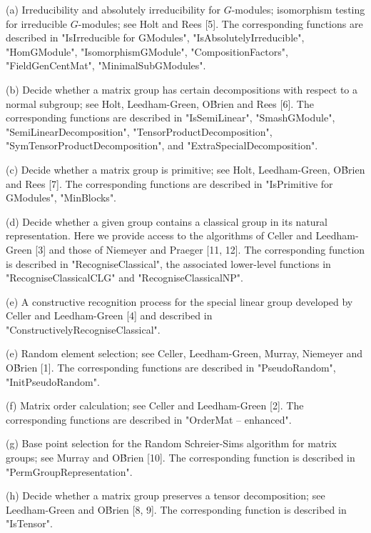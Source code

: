 (a) Irreducibility  and   absolutely irreducibility   for $G$-modules;
    isomorphism testing for irreducible $G$-modules; see Holt and Rees
    [5].  The  corresponding functions are described in "IsIrreducible
    for     GModules",      "IsAbsolutelyIrreducible",   "HomGModule",
    "IsomorphismGModule",   "CompositionFactors",   "FieldGenCentMat",
    "MinimalSubGModules".

(b) Decide whether a matrix group  has certain decompositions with
    respect  to a normal subgroup;  see Holt, Leedham-Green, O\'Brien and
    Rees  [6].    The   corresponding   functions  are    described    in
    "IsSemiLinear",       "SmashGModule",      "SemiLinearDecomposition",
    "TensorProductDecomposition",   "SymTensorProductDecomposition",  and
    "ExtraSpecialDecomposition".

(c) Decide whether a matrix group  is primitive; see Holt, Leedham-Green,
    O\'Brien and Rees [7].  The  corresponding functions are described in
    "IsPrimitive for GModules", "MinBlocks".

(d) Decide   whether a given  group  contains  a  classical  group in its
    natural  representation. Here we  provide access to the algorithms of
    Celler  and Leedham-Green [3] and those  of Niemeyer and Praeger [11,
    12].       The corresponding      function     is   described      in
    "RecogniseClassical", the   associated   lower-level  functions    in
    "RecogniseClassicalCLG" and "RecogniseClassicalNP".

(e) A  constructive recognition  process  for  the  special  linear group
    developed by Celler    and   Leedham-Green  [4]  and described     in
    "ConstructivelyRecogniseClassical".

(e) Random element selection; see Celler, Leedham-Green, Murray, Niemeyer
    and  O\'Brien [1].    The corresponding functions   are described  in
    "PseudoRandom", "InitPseudoRandom".

(f) Matrix   order calculation; see   Celler and  Leedham-Green [2].  The
    corresponding functions are described in "OrderMat -- enhanced".

(g) Base point  selection   for the  Random  Schreier-Sims algorithm  for
    matrix  groups;  see  Murray and O\'Brien    [10].  The corresponding
    function is described in "PermGroupRepresentation".

(h) Decide  whether a matrix group preserves  a tensor decomposition; see
    Leedham-Green and O\'Brien [8,  9].  The corresponding function  is
    described in "IsTensor".

